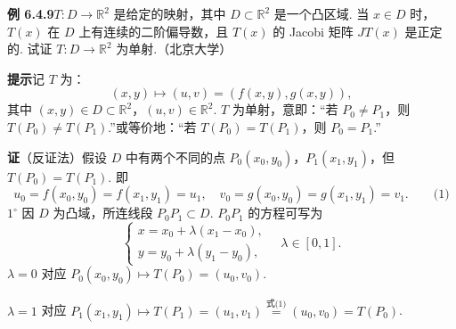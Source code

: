 \documentclass[UTF8, 12pt, fontset=fandol, oneside]{ctexart}
\begin{document}
\noindent\textbf{例 6.4.9}\quad $T:D\to\mathbb R^2$ 是给定的映射，其中 $D\subset\mathbb R^2$ 是一个凸区域. 当 $x\in D$ 时，$T(x)$ 在 $D$ 上有连续的二阶偏导数，且 $T(x)$ 的 Jacobi 矩阵 $JT(x)$ 是正定的. 试证 $T:D\to\mathbb R^2$ 为单射.（北京大学）

\noindent\textbf{提示}\quad 记 $T$ 为：
\[
  (x,y)\mapsto(u,v)=(f(x,y),g(x,y)),
\]
其中 $(x,y)\in D\subset\mathbb R^2$，$(u,v)\in\mathbb R^2$. $T$ 为单射，意即：“若 $P_0\ne P_1$，则 $T(P_0)\ne T(P_1)$.”或等价地：“若 $T(P_0)=T(P_1)$，则 $P_0=P_1$.”

\noindent\textbf{证}\quad （反证法）假设 $D$ 中有两个不同的点 $P_0(x_0,y_0)$，$P_1(x_1,y_1)$，但 $T(P_0)=T(P_1)$. 即
\[
  u_0=f(x_0,y_0)=f(x_1,y_1)=u_1,\quad
  v_0=g(x_0,y_0)=g(x_1,y_1)=v_1. \qquad\text{(1)}
\]
$1^\circ$ 因 $D$ 为凸域，所连线段 $P_0P_1\subset D$. $P_0P_1$ 的方程可写为
\[
\begin{cases}
  x=x_0+\lambda(x_1-x_0),\\
  y=y_0+\lambda(y_1-y_0),
\end{cases}\quad \lambda\in[0,1].
\]
$\lambda=0$ 对应 $P_0(x_0,y_0)\mapsto T(P_0)=(u_0,v_0)$.

$\lambda=1$ 对应 $P_1(x_1,y_1)\mapsto T(P_1)=(u_1,v_1)\overset{\text{式(1)}}{=}(u_0,v_0)=T(P_0)$.
\end{document}
